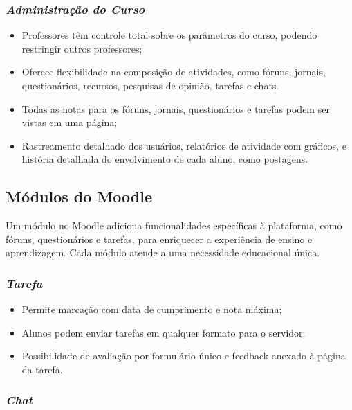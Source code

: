 \subsubsection{\textbf{\textit{Administração do Curso}}}

\begin{itemize}
    \item Professores têm controle total sobre os parâmetros do curso, podendo restringir outros professores;
\item Oferece flexibilidade na composição de atividades, como fóruns, jornais, questionários, recursos, pesquisas de opinião, tarefas e chats. 
\item Todas as notas para os fóruns, jornais, questionários e tarefas podem ser vistas em uma página;
\item Rastreamento detalhado dos usuários, relatórios de atividade com gráficos, e história detalhada do envolvimento de cada aluno, como postagens.

\end{itemize}

\subsection{\textbf{Módulos do Moodle}}

Um módulo no Moodle adiciona funcionalidades específicas à plataforma, como fóruns, questionários e tarefas, para enriquecer a experiência de ensino e aprendizagem. Cada módulo atende a uma necessidade educacional única.

\subsubsection{\textbf{\textit{Tarefa}}}

\begin{itemize}
    \item Permite marcação com data de cumprimento e nota máxima;
    \item Alunos podem enviar tarefas em qualquer formato para o servidor;
    \item Possibilidade de avaliação por formulário único e feedback anexado à página da tarefa.
\end{itemize}

\subsubsection{\textbf{\textit{Chat}}}

